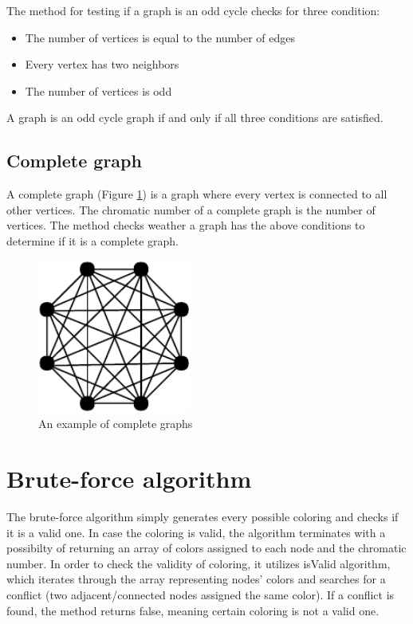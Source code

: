\documentclass[a4paper]{report}
\begin{document}
			The method for testing if a graph is an odd cycle checks for three condition:
			\begin{itemize}
				\item The number of vertices is equal to the number of edges
				\item Every vertex has two neighbors
				\item The number of vertices is odd
			\end{itemize}
			A graph is an odd cycle graph if and only if all three conditions are satisfied.
			
			\subsection{Complete graph}
			A complete graph (Figure \ref{fig:complete}) is a graph where every vertex is connected to all other vertices. The chromatic number of a complete graph is the number of vertices. The method checks weather a graph has the above conditions to determine if it is a complete graph.
			\begin{figure}[h]
				\centering
				\includegraphics[width=50mm,scale=0.5]{figures/complete.pdf}
				\caption{An example of complete graphs}
				\label{fig:complete}
			\end{figure}
			
		\section{Brute-force algorithm}
		The brute-force algorithm simply generates every possible coloring and checks if it is a valid one. In case the coloring is valid, the algorithm terminates with a possibilty of returning an array of colors assigned to each node and the chromatic number. In order to check the validity of coloring, it utilizes isValid algorithm, which iterates through the array representing nodes' colors and searches for a conflict (two adjacent/connected nodes assigned the same color). If a conflict is found, the method returns false, meaning certain coloring is not a valid one.\\
		
\end{document}
